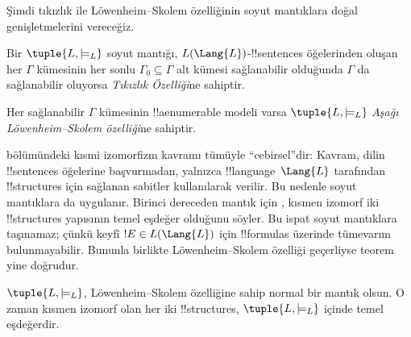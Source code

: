 



Şimdi tıkızlık ile L\"owenheim--Skolem özelliğinin soyut mantıklara doğal
genişletmelerini vereceğiz.

\begin{defn}
Bir $\tuple{L,\models_L}$ soyut mantığı, $L(\Lang{L})$-!!{sentence}s
öğelerinden oluşan her $\Gamma$ kümesinin her sonlu
$\Gamma_0\subseteq\Gamma$ alt kümesi sağlanabilir olduğunda $\Gamma$ da
sağlanabilir oluyorsa \emph{Tıkızlık Özelliği}ne sahiptir.
\end{defn}

\begin{defn}
Her sağlanabilir $\Gamma$ kümesinin !!a{enumerable} modeli varsa
$\tuple{L,\models_L}$ \emph{Aşağı L\"owenheim--Skolem özelliği}ne sahiptir.
\end{defn}

 bölümündeki kısmi izomorfizm kavramı
tümüyle ``cebirsel''dir: Kavram, dilin !!{sentence}s öğelerine başvurmadan,
yalnızca !!{language}~$\Lang{L}$ tarafından !!{structure}s için sağlanan
sabitler kullanılarak verilir. Bu nedenle soyut mantıklara da
uygulanır. Birinci dereceden mantık için
, kısmen izomorf iki !!{structure}s yapısının
temel eşdeğer olduğunu söyler. Bu ispat soyut mantıklara taşınamaz; çünkü
keyfî $!E\in L(\Lang{L})$ için !!{formula}s üzerinde tümevarım bulunmayabilir.
Bununla birlikte L\"owenheim--Skolem özelliği geçerliyse teorem yine doğrudur.

\begin{thm}
$\tuple{L,\models_L}$, L\"owenheim--Skolem özelliğine sahip normal bir
mantık olsun. O zaman kısmen izomorf olan her iki !!{structure}s,
$\tuple{L,\models_L}$ içinde temel eşdeğerdir.
\end{thm}

